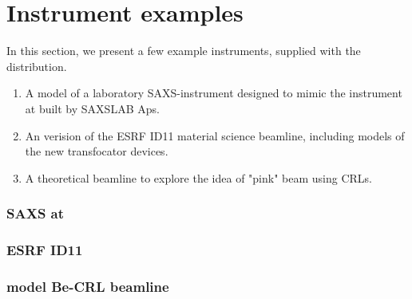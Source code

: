 
\chapter{Instrument examples}
\label{s:instrument}

In this section, we present a few example instruments, supplied with the \MCX distribution.
\begin{enumerate}
\item A model of a laboratory SAXS-instrument designed to mimic the instrument at \Lifelong built by SAXSLAB Aps.
\item An verision of the ESRF ID11 material science beamline, including models of the new transfocator devices.
\item A theoretical beamline to explore the idea of "pink" beam using CRLs.
\end{enumerate}


\subsection{SAXS at \Lifelong}
\label{ss:saxs}


\subsection{ESRF ID11}
\label{ss:id11}

\subsection{model Be-CRL beamline}
\label{ss:be-crl}


